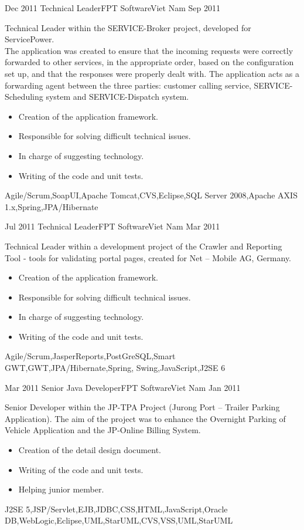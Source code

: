 \begin{experiences}
\experience
  {Dec 2011}  {Technical Leader}{FPT Software}{Viet Nam}
  {Sep 2011}   {
Technical Leader within the SERVICE-Broker project, developed for ServicePower.\\
The application was created to ensure that the incoming requests were correctly forwarded to other services, in the appropriate order, based on the configuration set up, and that the responses were properly dealt with. The application acts as a forwarding agent between the three parties: customer calling service, SERVICE-Scheduling system and SERVICE-Dispatch system.
	\begin{itemize}
        \item Creation of the application framework.       
        \item Responsible for solving difficult technical issues.                 \item In charge of suggesting technology.
        \item Writing of the code and unit tests.
	\end{itemize}
}
{Agile/Scrum,SoapUI,Apache Tomcat,CVS,Eclipse,SQL Server 2008,Apache AXIS 1.x,Spring,JPA/Hibernate}
\emptySeparator

\experience
  {Jul 2011}  {Technical Leader}{FPT Software}{Viet Nam}
  {Mar 2011}   {
Technical Leader within a development project of the Crawler and Reporting Tool - tools for validating portal pages, created for Net – Mobile AG, Germany.
	\begin{itemize}
        \item Creation of the application framework.       
        \item Responsible for solving difficult technical issues.                 \item In charge of suggesting technology.
        \item Writing of the code and unit tests.
	\end{itemize}
}
{Agile/Scrum,JasperReports,PostGreSQL,Smart GWT,GWT,JPA/Hibernate,Spring, Swing,JavaScript,J2SE 6}
\emptySeparator

\experience
  {Mar 2011}  {Senior Java Developer}{FPT Software}{Viet Nam}
  {Jan 2011}   {
Senior Developer within the JP-TPA Project (Jurong Port – Trailer Parking Application). The aim of the project was to enhance the Overnight Parking of Vehicle Application and the JP-Online Billing System.
	\begin{itemize}
        \item Creation of the detail design document.       
        \item Writing of the code and unit tests.           
        \item Helping junior member.
	\end{itemize}
}
{J2SE 5,JSP/Servlet,EJB,JDBC,CSS,HTML,JavaScript,Oracle DB,WebLogic,Eclipse,UML,StarUML,CVS,VSS,UML,StarUML}
\emptySeparator


\end{experiences}
